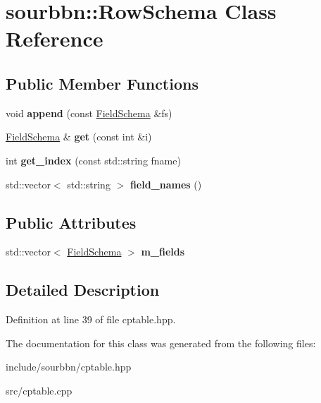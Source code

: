 \hypertarget{classsourbbn_1_1RowSchema}{}\section{sourbbn\+:\+:Row\+Schema Class Reference}
\label{classsourbbn_1_1RowSchema}
\subsection*{Public Member Functions}
\begin{DoxyCompactItemize}
\item 
\mbox{\label{classsourbbn_1_1RowSchema_a5e9be140ee16181a0835f2821dad7cd4}} 
void {\bfseries append} (const \hyperlink{classsourbbn_1_1FieldSchema}{Field\+Schema} \&fs)
\item 
\mbox{\label{classsourbbn_1_1RowSchema_a08718c3ed6030de0d83efcc202beec76}} 
\hyperlink{classsourbbn_1_1FieldSchema}{Field\+Schema} \& {\bfseries get} (const int \&i)
\item 
\mbox{\label{classsourbbn_1_1RowSchema_ab352bc8f89c640ff419c9b3c6947fdde}} 
int {\bfseries get\+\_\+index} (const std\+::string fname)
\item 
\mbox{\label{classsourbbn_1_1RowSchema_a371ecb830909034f7b5bde15d06f1995}} 
std\+::vector$<$ std\+::string $>$ {\bfseries field\+\_\+names} ()
\end{DoxyCompactItemize}
\subsection*{Public Attributes}
\begin{DoxyCompactItemize}
\item 
\mbox{\label{classsourbbn_1_1RowSchema_abe131bb4b83932aae758a5d01b212d04}} 
std\+::vector$<$ \hyperlink{classsourbbn_1_1FieldSchema}{Field\+Schema} $>$ {\bfseries m\+\_\+fields}
\end{DoxyCompactItemize}


\subsection{Detailed Description}


Definition at line 39 of file cptable.\+hpp.



The documentation for this class was generated from the following files\+:\begin{DoxyCompactItemize}
\item 
include/sourbbn/cptable.\+hpp\item 
src/cptable.\+cpp\end{DoxyCompactItemize}

